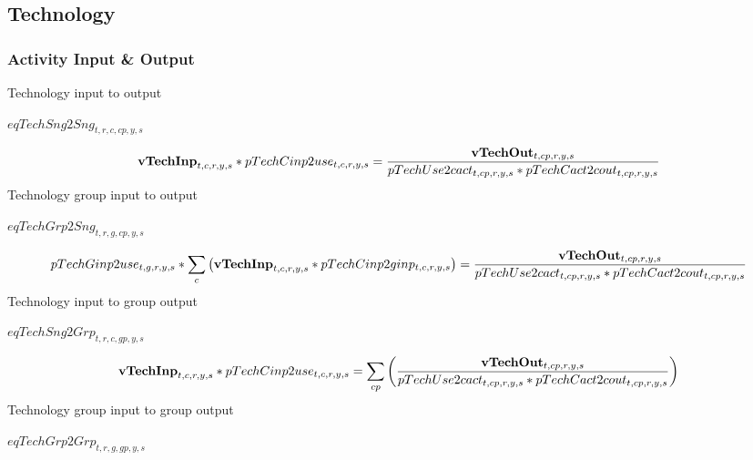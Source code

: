 \documentclass{article}
\begin{document}
\subsection*{Technology}
\subsubsection*{Activity Input \& Output}
Technology input to output







$eqTechSng2Sng_{t,r,c,cp,y,s}$





\begin{dmath} 
{\bf vTechInp}_{t,c,r,y,s}*pTechCinp2use_{t,c,r,y,s}  =  \frac{{\bf vTechOut}_{t,cp,r,y,s}}{pTechUse2cact_{t,cp,r,y,s}*pTechCact2cout_{t,cp,r,y,s}}
\end{dmath} 
Technology group input to output







$eqTechGrp2Sng_{t,r,g,cp,y,s}$





\begin{dmath} 
pTechGinp2use_{t,g,r,y,s}*\sum_{c}{\left({\bf vTechInp}_{t,c,r,y,s}*pTechCinp2ginp_{t,c,r,y,s}\right)}  =  \frac{{\bf vTechOut}_{t,cp,r,y,s}}{pTechUse2cact_{t,cp,r,y,s}*pTechCact2cout_{t,cp,r,y,s}}
\end{dmath} 
Technology input to group output







$eqTechSng2Grp_{t,r,c,gp,y,s}$





\begin{dmath} 
{\bf vTechInp}_{t,c,r,y,s}*pTechCinp2use_{t,c,r,y,s}  =  \sum_{cp}{\left(\frac{{\bf vTechOut}_{t,cp,r,y,s}}{pTechUse2cact_{t,cp,r,y,s}*pTechCact2cout_{t,cp,r,y,s}}\right)}
\end{dmath} 
Technology group input to group output







$eqTechGrp2Grp_{t,r,g,gp,y,s}$
\end{document}
